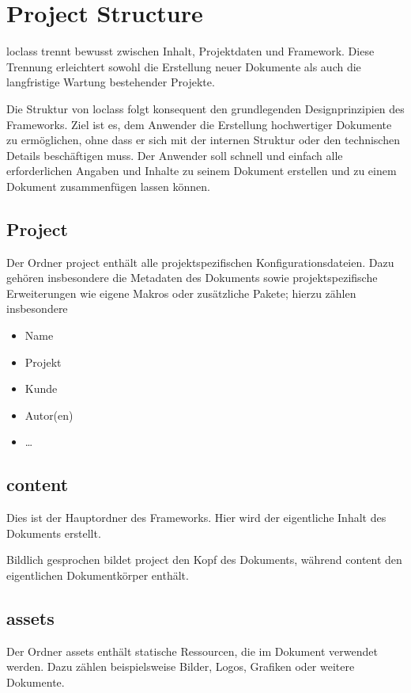 \chapter{Project Structure}

loclass trennt bewusst zwischen Inhalt, Projektdaten und Framework. Diese Trennung erleichtert sowohl die Erstellung neuer Dokumente als auch die langfristige Wartung bestehender Projekte.

Die Struktur von loclass folgt konsequent den grundlegenden Designprinzipien des Frameworks. Ziel ist es, dem Anwender die Erstellung hochwertiger Dokumente zu ermöglichen, ohne dass er sich mit der internen Struktur oder den technischen Details beschäftigen muss. Der Anwender soll schnell und einfach alle erforderlichen Angaben und Inhalte zu seinem Dokument erstellen und zu einem Dokument zusammenfügen lassen können. 

\section{Project}

Der Ordner project enthält alle projektspezifischen Konfigurationsdateien. Dazu gehören insbesondere die Metadaten des Dokuments sowie projektspezifische Erweiterungen wie eigene Makros oder zusätzliche Pakete; hierzu zählen insbesondere

\begin{itemize}
    \item Name
    \item Projekt
    \item Kunde
    \item Autor(en)
    \item \dots
\end{itemize}

\section{content}

Dies ist der Hauptordner des Frameworks. Hier wird der eigentliche Inhalt des Dokuments erstellt.

Bildlich gesprochen bildet project den Kopf des Dokuments, während content den eigentlichen Dokumentkörper enthält.

\section{assets}

Der Ordner assets enthält statische Ressourcen, die im Dokument verwendet werden. Dazu zählen beispielsweise Bilder, Logos, Grafiken oder weitere Dokumente.

